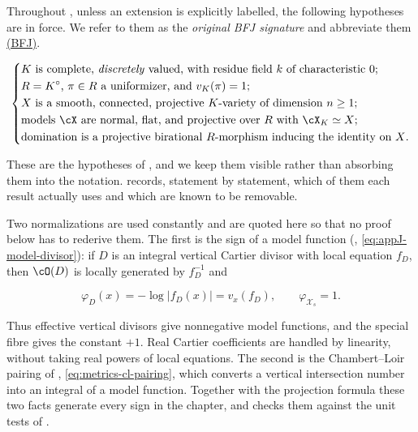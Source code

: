 Throughout , unless an
extension is explicitly labelled, the following hypotheses are in force.  We
refer to them as the \emph{original BFJ signature} and abbreviate them
\hyperref[eq:ch20-standing]{\textup{(BFJ)}}.

\begin{equation}
\label{eq:ch20-standing}
\left\{
\begin{aligned}
 &\text{$K$ is complete, \emph{discretely} valued, with residue field
   $k$ of characteristic $0$;}\\
 &\text{$R=K^\circ$, $\pi\in R$ a uniformizer, and $v_K(\pi)=1$;}\\
 &\text{$X$ is a smooth, connected, projective $K$-variety of dimension
   $n\geq1$;}\\
 &\text{models $\cX$ are normal, flat, and projective over $R$ with
   $\cX_K\simeq X$;}\\
 &\text{domination is a projective birational $R$-morphism inducing the
   identity on $X$.}
\end{aligned}
\right.
\end{equation}

These are the hypotheses of \cite{BFJ16}, and we keep them visible rather
than absorbing them into the notation.   records, statement by statement, which of
them each result actually uses and which are known to be removable.

Two normalizations are used constantly and are quoted here so that no proof
below has to rederive them.  The first is the sign of a model function
(, \eqref{eq:appJ-model-divisor}):
if $D$ is an integral vertical Cartier divisor with local equation $f_D$, then
$\cO(D)$ is locally generated by $f_D^{-1}$ and

\begin{equation}
\label{eq:ch20-sign}
              \varphi_D(x)=-\log|f_D(x)|=v_x(f_D),
              \qquad \varphi_{\mathcal X_s}=1.
\end{equation}

Thus effective vertical divisors give nonnegative model functions, and the
special fibre gives the constant $+1$.  Real Cartier coefficients are
handled by linearity, without taking real powers of local equations.
The second is the
Chambert--Loir pairing of ,
\eqref{eq:metrics-cl-pairing}, which converts a vertical intersection number
into an integral of a model function.  Together with the projection formula
 these two facts generate every sign in
the chapter, and  checks them against the
unit tests of .

